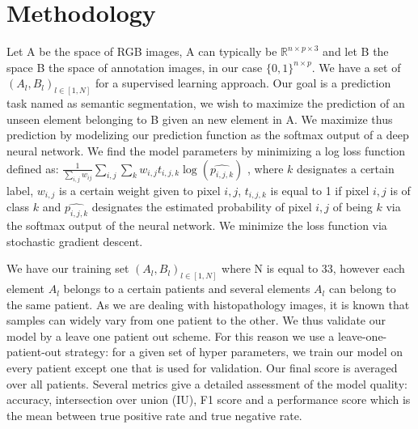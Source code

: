 \documentclass{article}
\begin{document}
\section{Methodology}
\label{sec:method}
\noindent Let A be the space of RGB images, A can typically be 
$\mathbb{R}^{n \times p \times 3}$ and let B the space B the space of annotation 
images, in our case $\{0,1\}^{n \times p}$. We have a set of 
$(A_l,B_l)_{l \in [1, N]}$ for a supervised learning approach. Our goal is 
a prediction task 
named as semantic segmentation, we wish to maximize the prediction of 
an unseen element belonging to B given an new element in A. We maximize 
thus prediction by modelizing our prediction function as the softmax output of a deep neural 
network. We find the model parameters by minimizing a log loss function 
defined as:
 $\frac{1}{\sum_{i,j}w_{ij}} \sum_{i,j} \sum_k w_{i,j} t_{i,j,k} \log (\widehat{p_{i,j,k}})$
, where $k$ designates a certain label, $w_{i,j}$ is a 
certain weight given to pixel $i,j$, $t_{i,j,k}$ is equal to 1 if pixel $i,j$ is 
of class $k$ and $\widehat{p_{i,j,k}}$ designates the estimated probability 
of pixel $i,j$ of being $k$ via the softmax output of the neural network.
We minimize the loss function via stochastic gradient descent.

We have our training set $(A_l,B_l)_{l \in [1, N]}$ where N is equal to 
33, however each element $A_l$ belongs to a certain patients and 
several elements $A_l$ can belong to the same patient. As we are 
dealing with histopathology images, it is known that samples can widely 
vary from one patient to the other. We thus validate our model by a 
leave one patient out scheme. 
For this reason we use a leave-one-patient-out strategy: for a 
given set of hyper parameters, we 
train our model on every patient except one that is used for validation. 
Our final score is averaged over all patients.
Several metrics give a detailed assessment of the model quality: accuracy, intersection over union (IU),
F1 score and a performance score which is the mean between 
true positive rate and true negative rate.
\end{document}
